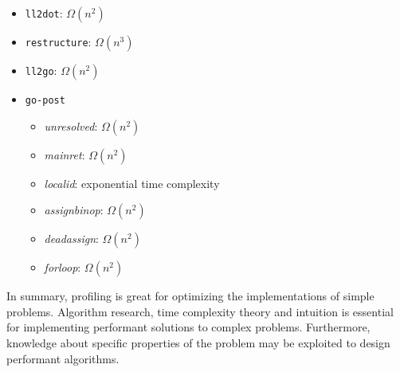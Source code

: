 \begin{itemize}
	\item \texttt{ll2dot}: $ \Omega(n^{2}) $
	\item \texttt{restructure}: $ \Omega(n^{3}) $
	\item \texttt{ll2go}: $ \Omega(n^{2}) $
	\item \texttt{go-post}
	\begin{itemize}
		\item \textit{unresolved}: $ \Omega(n^{2}) $
		\item \textit{mainret}: $ \Omega(n^{2}) $
		\item \textit{localid}: exponential time complexity
		\item \textit{assignbinop}: $ \Omega(n^{2}) $
		\item \textit{deadassign}: $ \Omega(n^{2}) $
		\item \textit{forloop}: $ \Omega(n^{2}) $
	\end{itemize}
\end{itemize}

In summary, profiling is great for optimizing the implementations of simple problems. Algorithm research, time complexity theory and intuition is essential for implementing performant solutions to complex problems. Furthermore, knowledge about specific properties of the problem may be exploited to design performant algorithms.




